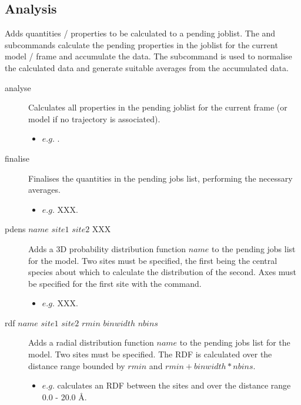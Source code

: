 \subsection{Analysis}
Adds quantities / properties to be calculated to a pending joblist. The  and  subcommands calculate the pending properties in the joblist for the current model / frame and accumulate the data. The  subcommand is used to normalise the calculated data and generate suitable averages from the accumulated data.\\
\begin{description}

	\item[analyse\its] Calculates all properties in the pending joblist for the current frame (or model if no trajectory is associated).
	\begin{itemize}
		\item $e.g.$ .
	\end{itemize}

	\item[finalise\its] Finalises the quantities in the pending jobs list, performing the necessary averages.
	\begin{itemize}
		\item $e.g.$  XXX.
	\end{itemize}

	\item[pdens $name$ $site1$ $site2$ XXX\its] Adds a 3D probability distribution function $name$ to the pending jobs list for the model. Two sites must be specified, the first being the central species about which to calculate the distribution of the second. Axes must be specified for the first site with the  command.
	\begin{itemize}
		\item $e.g.$  XXX.
	\end{itemize}

	\item[rdf $name$ $site1$ $site2$ $rmin$ $binwidth$ $nbins$\its] Adds a radial distribution function $name$ to the pending jobs list for the model. Two sites must be specified. The RDF is calculated over the distance range bounded by $rmin$ and $rmin + binwidth*nbins$.
	\begin{itemize}
		\item $e.g.$  calculates an RDF between the sites  and  over the distance range 0.0 - 20.0 \AA{}.
	\end{itemize}

\end{description}

